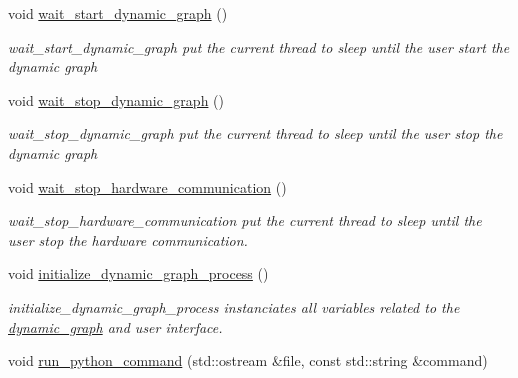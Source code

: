 \begin{DoxyCompactItemize}
\mbox{\label{classdynamic__graph_1_1DynamicGraphManager_a18dab9ca9c8901779a944386f2b8898c}} 
void \hyperlink{classdynamic__graph_1_1DynamicGraphManager_a18dab9ca9c8901779a944386f2b8898c}{wait\+\_\+start\+\_\+dynamic\+\_\+graph} ()
\begin{DoxyCompactList}\small\item\em wait\+\_\+start\+\_\+dynamic\+\_\+graph put the current thread to sleep until the user start the dynamic graph \end{DoxyCompactList}\item 
\mbox{\label{classdynamic__graph_1_1DynamicGraphManager_ab827a776b4ac31ea91ace9a2bfc1e99d}} 
void \hyperlink{classdynamic__graph_1_1DynamicGraphManager_ab827a776b4ac31ea91ace9a2bfc1e99d}{wait\+\_\+stop\+\_\+dynamic\+\_\+graph} ()
\begin{DoxyCompactList}\small\item\em wait\+\_\+stop\+\_\+dynamic\+\_\+graph put the current thread to sleep until the user stop the dynamic graph \end{DoxyCompactList}\item 
void \hyperlink{classdynamic__graph_1_1DynamicGraphManager_a83a98e169cd587d101bba69bb799e408}{wait\+\_\+stop\+\_\+hardware\+\_\+communication} ()
\begin{DoxyCompactList}\small\item\em wait\+\_\+stop\+\_\+hardware\+\_\+communication put the current thread to sleep until the user stop the hardware communication. \end{DoxyCompactList}\item 
\mbox{\label{classdynamic__graph_1_1DynamicGraphManager_a81926d5d33573d667bc6511bbb2d8f52}} 
void \hyperlink{classdynamic__graph_1_1DynamicGraphManager_a81926d5d33573d667bc6511bbb2d8f52}{initialize\+\_\+dynamic\+\_\+graph\+\_\+process} ()
\begin{DoxyCompactList}\small\item\em initialize\+\_\+dynamic\+\_\+graph\+\_\+process instanciates all variables related to the \hyperlink{namespacedynamic__graph}{dynamic\+\_\+graph} and user interface. \end{DoxyCompactList}\item 
void \hyperlink{classdynamic__graph_1_1DynamicGraphManager_a56acce72235fe0786830ec19a3439309}{run\+\_\+python\+\_\+command} (std\+::ostream \&file, const std\+::string \&command)

\end{DoxyCompactItemize}
